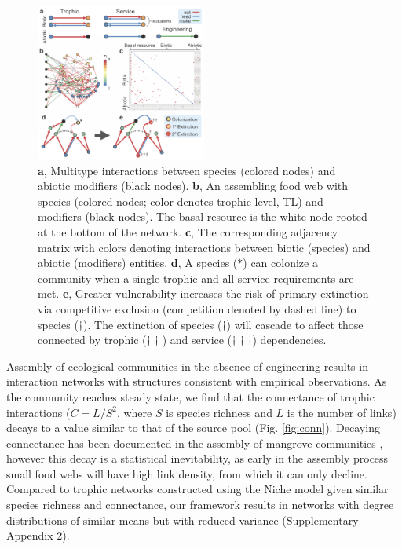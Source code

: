 \documentclass[twocolumn,preprintnumbers,amsmath,amssymb,superscriptaddress,linenumbers]{revtex4-1}
\begin{document}
\begin{figure}[h!]
\centering
\includegraphics[width=0.5\textwidth]{fig_model.png}
\vspace{0mm}
\caption{
\textbf{a}, Multitype interactions between species (colored nodes) and abiotic modifiers (black nodes).
\textbf{b}, An assembling food web with species (colored nodes; color denotes trophic level, TL) and modifiers (black nodes). The basal resource is the white node rooted at the bottom of the network.
\textbf{c}, The corresponding adjacency matrix with colors denoting interactions between biotic (species) and abiotic (modifiers) entities.
\textbf{d}, A species ($\ast$) can colonize a community when a single trophic and all service requirements are met.
\textbf{e}, Greater vulnerability increases the risk of primary extinction via competitive exclusion (competition denoted by dashed line) to species ($\dag$).
The extinction of species ($\dag$) will cascade to affect those connected by trophic ($\dag \dag$) and service ($\dag \dag \dag$) dependencies. 
\vspace{-3mm}
}
\vspace{0mm}
\label{fig:model}
\end{figure}

Assembly of ecological communities in the absence of engineering results in interaction networks with structures consistent with empirical observations.
As the community reaches steady state, we find that the connectance of trophic interactions ($C=L/S^2$, where $S$ is species richness and $L$ is the number of links) decays to a value similar to that of the source pool (Fig. \ref{fig:conn}).
Decaying connectance has been documented in the assembly of mangrove communities \cite{Piechnik2008}, however this decay is a statistical inevitability, as early in the assembly process small food webs will have high link density, from which it can only decline.
Compared to trophic networks constructed using the Niche model \cite{Williams2000} given similar species richness and connectance, our framework results in networks with degree distributions of similar means but with reduced variance (Supplementary Appendix 2).
\end{document}

